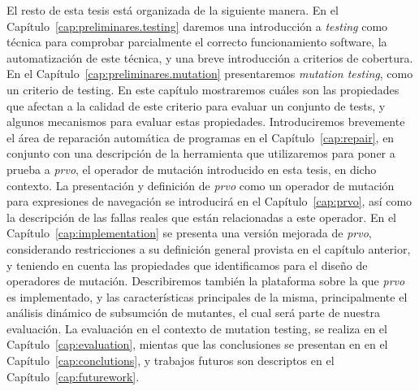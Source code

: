 El resto de esta tesis est\'a organizada de la siguiente manera. En el Cap\'itulo~\ref{cap:preliminares.testing} daremos una introducci\'on a \emph{testing} como t\'ecnica para comprobar parcialmente el correcto funcionamiento software, la automatizaci\'on de este t\'ecnica, y una breve introducci\'on a criterios de cobertura. En el Cap\'itulo~\ref{cap:preliminares.mutation} presentaremos \emph{mutation testing}, como un criterio de testing. En este cap\'itulo mostraremos cu\'ales son las propiedades que afectan a la calidad de este criterio para evaluar un conjunto de tests, y algunos mecanismos para evaluar estas propiedades. Introduciremos brevemente el \'area de reparaci\'on autom\'atica de programas en el Cap\'itulo~\ref{cap:repair}, en conjunto con una descripci\'on de la herramienta que utilizaremos para poner a prueba a \emph{prvo}, el operador de mutaci\'on introducido en esta tesis, en dicho contexto. La presentaci\'on y definici\'on de \emph{prvo} como un operador de mutaci\'on para expresiones de navegaci\'on se introducir\'a en el Cap\'itulo~\ref{cap:prvo}, as\'i como la descripci\'on de las fallas reales que est\'an relacionadas a este operador. En el Cap\'itulo~\ref{cap:implementation} se presenta una versi\'on mejorada de \emph{prvo}, considerando restricciones a su definici\'on general provista en el cap\'itulo anterior, y teniendo en cuenta las propiedades que identificamos para el dise\~no de operadores de mutaci\'on. Describiremos tambi\'en la plataforma sobre la que \emph{prvo} es implementado, y las caracter\'isticas principales de la misma, principalmente el an\'alisis din\'amico de subsumci\'on de mutantes, el cual ser\'a parte de nuestra evaluaci\'on. La evaluaci\'on en el contexto de mutation testing, se realiza en el Cap\'itulo~\ref{cap:evaluation}, mientas que las conclusiones se presentan en en el Cap\'itulo~\ref{cap:conclutions}, y trabajos futuros son descriptos en el Cap\'itulo~\ref{cap:futurework}.


